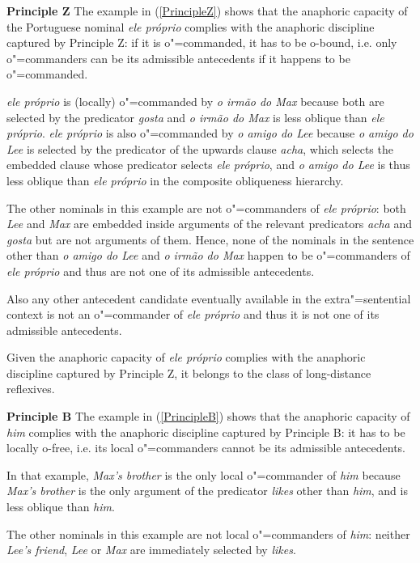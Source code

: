 \documentclass[output=paper
,modfonts
,nonflat]{langsci/langscibook}
\begin{document}
{\bf Principle Z} The example in (\ref{PrincipleZ}) shows that the anaphoric capacity of 
the Portuguese nominal {\em ele pr\'{o}prio} complies with 
the anaphoric discipline captured by Principle Z: if it is o"=commanded, it has to be o-bound, 
i.e. only o"=commanders can be its admissible antecedents if it happens to be o"=commanded.

{\em ele pr\'{o}prio} is (locally) o"=commanded by {\em o irm\~{a}o do Max} because both are selected 
by the predicator {\em gosta} and {\em o irm\~{a}o do Max} is less oblique than {\em ele pr\'{o}prio}.
{\em ele pr\'{o}prio} is also o"=commanded
by {\em o amigo do Lee} because {\em o amigo do Lee} is selected by the predicator of the upwards
clause {\em acha}, which selects the embedded clause whose predicator selects
{\em ele pr\'{o}prio}, and {\em o amigo do Lee} is thus less oblique than {\em ele pr\'{o}prio}
in the composite obliqueness hierarchy. 

The other nominals in this example are not o"=commanders of {\em ele pr\'{o}prio}: both
{\em Lee} and {\em Max} are embedded inside arguments of the relevant predicators {\em acha}
and {\em gosta} but are not arguments of them. Hence, none of
the nominals in the sentence other than {\em o amigo do Lee} and  {\em o irm\~{a}o do Max} happen 
to be o"=commanders of {\em ele pr\'{o}prio} and thus are not one of its admissible antecedents.

Also any other antecedent candidate eventually available in the extra"=sentential context is not
an o"=commander of {\em ele pr\'{o}prio} and thus it is not one of its admissible antecedents.

Given the anaphoric capacity of {\em ele pr\'{o}prio} complies with  the anaphoric discipline captured 
by Principle Z, it belongs to the class of long-distance reflexives.


{\bf Principle B} The example in (\ref{PrincipleB}) shows that the anaphoric capacity of {\em him} complies with 
the anaphoric discipline captured by Principle B: it has to be locally o-free, i.e. its local o"=commanders cannot
be its admissible antecedents.

In that example, {\em Max's brother} is the only local
o"=commander of {\em him} because {\em Max's brother} is the only argument of the predicator {\em likes} other than {\em him},
and is less oblique than {\em him}.

The other nominals in this example are not local o"=commanders of {\em him}: neither {\em Lee's friend},
{\em Lee} or {\em Max} are immediately selected by {\em likes}.
\end{document}
